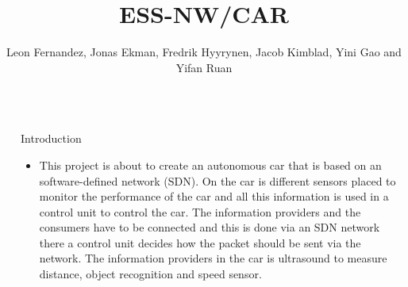 \documentclass[final,hyperref={pdfpagelabels=false}]{beamer}
\title{\huge ESS-NW/CAR} %
\author{Leon Fernandez, Jonas Ekman, Fredrik Hyyrynen, Jacob Kimblad, Yini Gao and  Yifan Ruan} %
\institute{ MF2063 Embedded Systems Design Project} %
\begin{document}

\begin{frame}[t] %

\begin{columns}[t] %

\begin{column}{.02\textwidth}\end{column} %

\begin{column}{.465\textwidth} %


            
\begin{block}{Introduction}

\begin{itemize}
\item This project is about to create an autonomous car that is based on an software-defined network (SDN). On the car is different sensors placed to monitor the performance of the car and all this information is used in a control unit to control the car. The information providers and the consumers have to be connected and this is done via an SDN network there a control unit decides how the packet should be sent via the network. The information providers in the car is ultrasound to measure distance, object recognition and speed sensor. 
\end{itemize}


\end{block}
\end{column}
\end{columns}
\end{frame}
\end{document}

